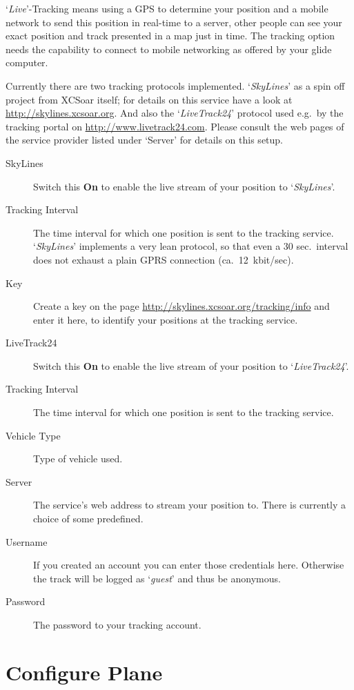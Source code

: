 `{\it Live}'-Tracking means using a GPS to determine your position and a mobile 
network to send this position in real-time to a server, other people can see 
your exact position and track presented in a map just in time.
The tracking option needs the capability to connect to mobile networking as offered by 
your glide computer.

Currently there are two tracking protocols implemented. `{\em SkyLines}' as a spin 
off project from XCSoar itself; for details on this service have a look at 
\url{http://skylines.xcsoar.org}. 
And also the `{\em LiveTrack24}' protocol used e.g.\ by the tracking
portal on \url{http://www.livetrack24.com}.  
Please consult the web pages of the service provider listed under `Server' 
for details on this setup.

\begin{description}
\item[SkyLines]  Switch this {\bf On} to enable the live stream of 
  your position to `{\em SkyLines}'.
\item[Tracking Interval]  The time interval for which one position is sent to
  the tracking service. `{\em SkyLines}' implements a very lean protocol, so that even
  a 30 sec.\ interval does not exhaust a plain GPRS connection (ca.\ 12~kbit/sec).
\item[Key]  Create a key on the page \url{http://skylines.xcsoar.org/tracking/info} 
  and enter it here, to identify your positions at the tracking service.
\\
\item[LiveTrack24]  Switch this {\bf On} to enable the live stream of 
  your position to `{\em LiveTrack24}'.
\item[Tracking Interval]  The time interval for which one position is sent to
  the tracking service.
\item[Vehicle Type]  Type of vehicle used.
\item[Server]  The service's web address to stream your position to. There is currently 
  a choice of some predefined.
\item[Username]  If you created an account you can enter those credentials here. 
  Otherwise the track will be logged as `{\it guest}' and thus be anonymous.  
\item[Password]  The password to your tracking account.
\end{description}


\section{Configure Plane}

